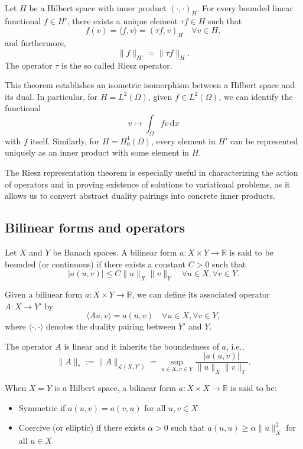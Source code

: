 \begin{theorem}
  \label{theo:riesz_representation}
Let $H$ be a Hilbert space with inner product $(\cdot, \cdot)_H$. For every bounded linear functional $f \in H'$, there exists a unique element $\tau f \in H$ such that
\[
f(v) = \langle f, v \rangle = (\tau f, v)_H \quad \forall v \in H,
\]
and furthermore,
\[
\|f\|_{H'} = \|\tau f\|_H.
\]
The operator $\tau$ is the so called Riesz operator.
\end{theorem}

This theorem establishes an isometric isomorphism between a Hilbert space and its dual. In particular, for $H = L^2(\Omega)$, given $f \in L^2(\Omega)$, we can identify the functional 
\[
v \mapsto \int_\Omega f v \, \mathrm{d}x
\]
with $f$ itself. Similarly, for $H = H^1_0(\Omega)$, every element in $H'$ can be represented uniquely as an inner product with some element in $H$.

The Riesz representation theorem is especially useful in characterizing the action of operators and in proving existence of solutions to variational problems, as it allows us to convert abstract duality pairings into concrete inner products.

\subsection{Bilinear forms and operators}

Let $X$ and $Y$ be Banach spaces. A bilinear form $a: X \times Y \to \mathbb{R}$ is said to be bounded (or continuous) if there exists a constant $C > 0$ such that
\[
|a(u, v)| \leq C \|u\|_X \|v\|_Y \quad \forall u \in X, \forall v \in Y.
\]

Given a bilinear form $a: X \times Y \to \mathbb{R}$, we can define its associated operator $A: X \to Y'$ by
\[
\langle Au, v \rangle = a(u, v) \quad \forall u \in X, \forall v \in Y,
\]
where $\langle \cdot, \cdot \rangle$ denotes the duality pairing between $Y'$ and $Y$.

The operator $A$ is linear and it inherits the boundedness of $a$, i.e.,
\[ 
  \|A\|_* := \|A\|_{\mathcal{L}(X,Y')} = \sup\limits_{u \in X, v \in Y} \frac{|a(u,v)|}{\|u\|_X \|v\|_Y}.
\]

When $X = Y$ is a Hilbert space, a bilinear form $a: X \times X \to \mathbb{R}$ is said to be:
\begin{itemize}
  \item Symmetric if $a(u, v) = a(v, u)$ for all $u, v \in X$
  \item Coercive (or elliptic) if there exists $\alpha > 0$ such that $a(u, u) \geq \alpha \|u\|_X^2$ for all $u \in X$
\end{itemize}

